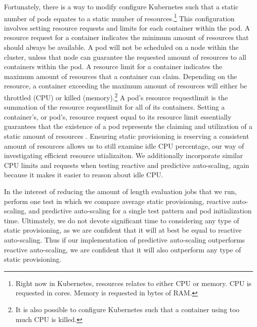 Fortunately, there is a way to modify configure Kubernetes such that a static number of
pods equates to a static number of resources.\footnote{Right now in Kubernetes,
resources relates to either CPU or memory. CPU is requested in cores. Memory is
requested in bytes of RAM.} This configuration involves
setting resource requests and limits for each container within the pod. A
resource request for a container indicates the minimum amount of resources that
should always be available. A pod will not be scheduled on a node within the
cluster, unless that node can guarantee the requested amount of resources to all
containers within the pod. A resource limit for a container indicates the
maximum amount of resources that a container can claim. Depending on the
resource, a container exceeding the maximum amount of resources will either be
throttled (CPU) or killed (memory).\footnote{It is also possible to configure
Kubernetes such that a container using too much CPU is killed.} A pod's resource
request\/limit is the summation of the resource request\/limit for all of its
containers. Setting a container's, or pod's, resource request equal to its
resource limit essentially guarantees that the existence of a pod represents the
claiming and utilization of a static amount of resources
\cite{k8s-compute-resources}. Ensuring static provisioning
is reserving a consistent amount of resources
allows us to still examine idle CPU percentage, our way of investigating
efficient resource utializaiton. We additionally incorporate similar CPU limits
and requests when testing reactive and predictive auto-scaling, again because it
makes it easier to reason about idle CPU.

In the interest of reducing the amount of length evaluation jobs that we run,
perform one test in which we compare average static provisioning, reactive
auto-scaling, and predictive auto-scaling for a single test pattern and pod
initialization time. Ultimately, we do not devote significant time to
considering any type of static provisioning, as we are confident that it will at
best be equal to reactive auto-scaling. Thus if our implementation of predictive
auto-scaling outperforms reactive auto-scaling, we are confident that it will
also outperform any type of static provisioning.

